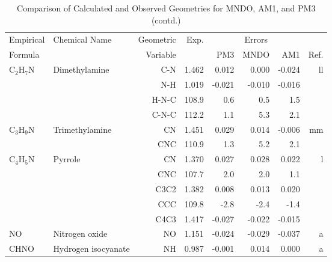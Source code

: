 \begin{table}
\caption{\label{geotabe}Comparison of Calculated and Observed Geometries for 
MNDO, AM1, and PM3 (contd.)}
\begin{center}
\compresstable
\begin{tabular}{llrrrrrr}
 Empirical  & Chemical Name &  Geometric &  Exp. & \multicolumn{3}{c}{Errors} & \\
  Formula   &               &  Variable &        & PM3  & MNDO  &  AM1 & Ref.\\
\hline
 C$_2$H$_7$N       & Dimethylamine                      &C-N           &     1.462   &     0.012 &     0.000 &    -0.024 &    ll \\
             &                                    &N-H           &     1.019   &    -0.021 &    -0.010 &    -0.016 &       \\
             &                                    &H-N-C       &     108.9   &       0.6 &       0.5 &       1.5   &       \\
             &                                    &C-N-C       &     112.2   &       1.1 &       5.3 &       2.1   &       \\
 C$_3$H$_9$N       & Trimethylamine                     &CN            &     1.451   &     0.029 &     0.014 &    -0.006 &    mm \\
             &                                    &CNC         &     110.9   &       1.3 &       5.2 &       2.1   &       \\
 C$_4$H$_5$N       & Pyrrole                            &CN            &     1.370   &     0.027 &     0.028 &     0.022 &     l \\
             &                                    &CNC         &     107.7   &       2.0 &       2.0 &       1.1   &       \\
             &                                    &C3C2          &     1.382   &     0.008 &     0.013 &     0.020 &       \\
             &                                    &CCC         &     109.8   &      -2.8 &      -2.4 &      -1.4   &       \\
             &                                    &C4C3          &     1.417   &    -0.027 &    -0.022 &    -0.015 &       \\
 NO          & Nitrogen oxide                     &NO            &     1.151   &    -0.024 &    -0.029 &    -0.037 &     a \\
 CHNO        & Hydrogen isocyanate                &NH            &     0.987   &    -0.001 &     0.014 &     0.000 &     a \\

\end{tabular}
\end{center}
\end{table}
